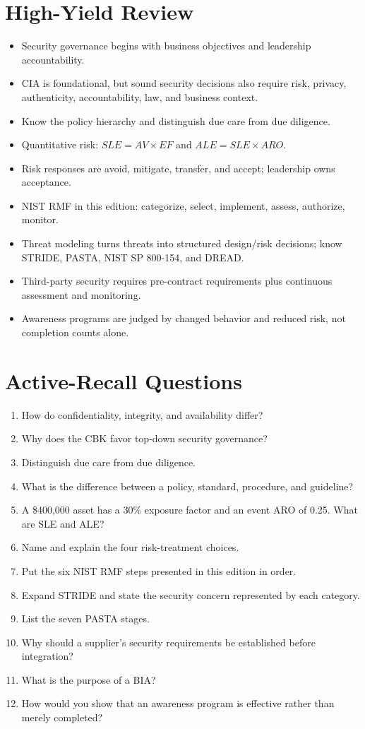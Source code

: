\documentclass[10pt,letterpaper]{article}
\begin{document}
\section{\color{navy}High-Yield Review}
\begin{itemize}
\item Security governance begins with business objectives and leadership accountability.
\item CIA is foundational, but sound security decisions also require risk, privacy, authenticity, accountability, law, and business context.
\item Know the policy hierarchy and distinguish due care from due diligence.
\item Quantitative risk: \(SLE=AV\times EF\) and \(ALE=SLE\times ARO\).
\item Risk responses are avoid, mitigate, transfer, and accept; leadership owns acceptance.
\item NIST RMF in this edition: categorize, select, implement, assess, authorize, monitor.
\item Threat modeling turns threats into structured design/risk decisions; know STRIDE, PASTA, NIST SP 800-154, and DREAD.
\item Third-party security requires pre-contract requirements plus continuous assessment and monitoring.
\item Awareness programs are judged by changed behavior and reduced risk, not completion counts alone.
\end{itemize}

\section{\color{navy}Active-Recall Questions}
\begin{enumerate}
\item How do confidentiality, integrity, and availability differ?
\item Why does the CBK favor top-down security governance?
\item Distinguish due care from due diligence.
\item What is the difference between a policy, standard, procedure, and guideline?
\item A \$400,000 asset has a 30\% exposure factor and an event ARO of 0.25. What are SLE and ALE?
\item Name and explain the four risk-treatment choices.
\item Put the six NIST RMF steps presented in this edition in order.
\item Expand STRIDE and state the security concern represented by each category.
\item List the seven PASTA stages.
\item Why should a supplier's security requirements be established before integration?
\item What is the purpose of a BIA?
\item How would you show that an awareness program is effective rather than merely completed?
\end{enumerate}
\end{document}

